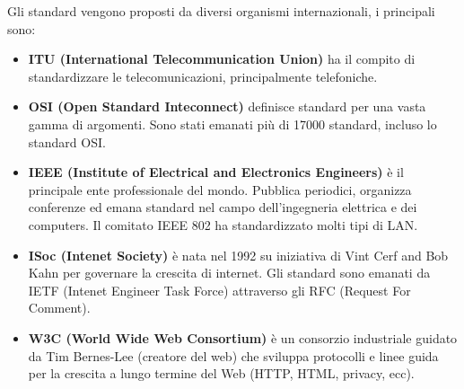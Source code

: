         Gli standard vengono proposti da diversi organismi internazionali, i principali sono:
        \begin{itemize}
            \item \textbf{ITU (International Telecommunication Union)} ha il compito di standardizzare le telecomunicazioni, principalmente telefoniche.
            \item \textbf{OSI (Open Standard Inteconnect)} definisce standard per una vasta gamma di argomenti. Sono stati emanati più di 17000 standard, incluso lo standard OSI.
            \item \textbf{IEEE (Institute of Electrical and Electronics Engineers)} è il principale ente professionale del mondo. Pubblica periodici, organizza conferenze ed emana standard nel campo dell'ingegneria elettrica e dei computers. Il comitato IEEE 802 ha standardizzato molti tipi di LAN.
            \item \textbf{ISoc (Intenet Society)} è nata nel 1992 su iniziativa di Vint Cerf and Bob Kahn per governare la crescita di internet. Gli standard sono emanati da IETF (Intenet Engineer Task Force) attraverso gli RFC (Request For Comment).
            \item \textbf{W3C (World Wide Web Consortium)} è un consorzio industriale guidato da Tim Bernes-Lee (creatore del web) che sviluppa protocolli e linee guida per la crescita a lungo termine del Web (HTTP, HTML, privacy, ecc).
        \end{itemize}